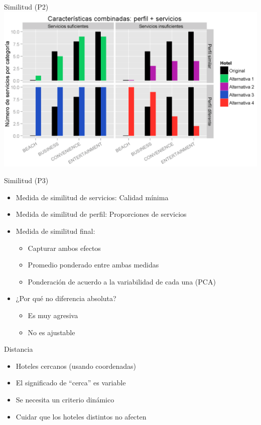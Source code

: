 \documentclass{beamer}
\begin{document}
\begin{frame}{Similitud (P2)}
	\includegraphics[width=\textwidth]{imagenes/similitud.png}
\end{frame}


\begin{frame}{Similitud (P3)}
	\begin{itemize}%
		\item Medida de similitud de servicios: Calidad mínima
		\item Medida de similitud de perfil: Proporciones de servicios
		\item Medida de similitud final:
		\begin{itemize}
			\item Capturar ambos efectos
			\item Promedio ponderado entre ambas medidas
			\item Ponderación de acuerdo a la variabilidad de cada una (PCA)
		\end{itemize}
		\item ¿Por qué no diferencia absoluta?
		\begin{itemize}
			\item Es muy agresiva
			\item No es ajustable
		\end{itemize}
	\end{itemize}
\end{frame}

\begin{frame}{Distancia}
	\begin{itemize}%
		\item Hoteles cercanos (usando coordenadas)
		\item El significado de ``cerca'' es variable
		\item Se necesita un criterio dinámico
		\item Cuidar que los hoteles distintos no afecten
	\end{itemize}
\end{frame}
\end{document}

